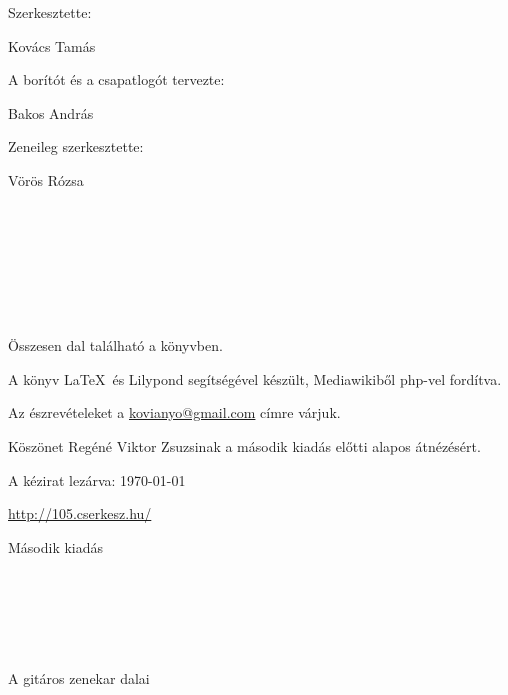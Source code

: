 \begin{center}
{\large
Szerkesztette:

Kovács Tamás

\begin{minipage}{\textwidth}
\vspace{0.6cm}
\end{minipage}

A borítót és a csapatlogót tervezte:

Bakos András

\begin{minipage}{\textwidth}
\vspace{0.6cm}
\end{minipage}

Zeneileg  szerkesztette:

Vörös Rózsa}

~\\[\baselineskip]
~\\[\baselineskip]
~\\[\baselineskip]
~\\[\baselineskip]
~\\[\baselineskip]
~\\[\baselineskip]
{\large

Összesen dal található a könyvben.

A könyv \LaTeX~és Lilypond segítségével készült, Mediawikiből php-vel fordítva.

Az észrevételeket a \mbox{\href{mailto:kovianyo@gmail.com}{kovianyo@gmail.com}} címre várjuk.

Köszönet Regéné Viktor Zsuzsinak a második kiadás előtti alapos átnézésért.

A kézirat lezárva: \today

\begin{minipage}{\textwidth}
\vspace{0.6cm}
\end{minipage}

\url{http://105.cserkesz.hu/}
}
\vfill

{\large
Második kiadás

\the\year}
\end{center}


\newpage

\begin{center}

~\\[\baselineskip]
~\\[\baselineskip]%

~\\[\baselineskip] %

{\Huge \textbf{\cim}} 
~\\[\baselineskip]
~\\[\baselineskip]
{\large A gitáros zenekar dalai}

\end{center}

